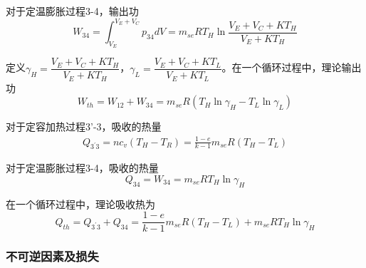 对于定温膨胀过程3-4，输出功
\begin{equation}
	W_{34} = \int^{V_E+V_C}_{V_E}{p_{34}dV}=m_{se}RT_H\ln{\frac{V_E+V_C+KT_H}{V_E+KT_H}}
\end{equation}

定义$\gamma_H = \dfrac{V_E+V_C+KT_H}{V_E+KT_H}$，$\gamma_L = \dfrac{V_E+V_C+KT_L}{V_E+KT_L}$。在一个循环过程中，理论输出功
\begin{equation}
	W_{th} = W_{12} + W_{34} = m_{se}R(T_H\ln\gamma_H - T_L\ln\gamma_L)
\end{equation}

对于定容加热过程3'-3，吸收的热量
\begin{equation}
	\begin{split}
		Q_{3^{'}3} = nc_v(T_H-T_R)
		=\frac{1-e}{k-1}m_{se}R(T_H-T_L)
	\end{split}
\end{equation}

对于定温膨胀过程3-4，吸收的热量
\begin{equation}
	Q_{34} = W_{34} = m_{se}RT_H\ln\gamma_H
\end{equation}

在一个循环过程中，理论吸收热为
\begin{equation}
	Q_{th} = Q_{3^{'}3} + Q_{34} = \frac{1-e}{k-1}m_{se}R(T_H-T_L) + m_{se}RT_H\ln\gamma_H
\end{equation}

\subsubsection{不可逆因素及损失}

